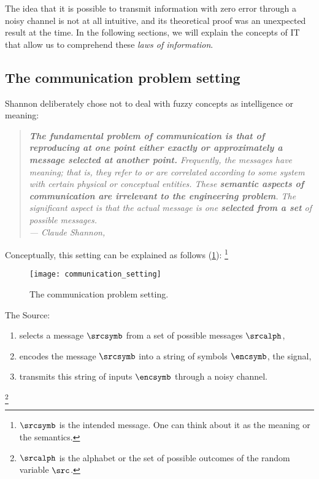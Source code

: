 The idea that it is possible to transmit information with zero error through a noisy channel is not at all intuitive, and its theoretical proof was an unexpected result at the time. In the following sections, we will explain the concepts of \ac{IT} that allow us to comprehend these \emph{laws of information}.

\subsection{The communication problem setting}\label{sec:communication_problem_setting}

Shannon deliberately chose not to deal with fuzzy concepts as intelligence or meaning:
\begin{quotation}
	\small \emph{ \textbf{The fundamental problem of communication is that of reproducing at one point either exactly or approximately a message selected at another point.} Frequently, the messages have meaning; that is, they refer to or are correlated according to some system with certain physical or conceptual entities. These \textbf{semantic aspects of communication are irrelevant to the engineering problem}. The significant aspect is that the actual message is one \textbf{selected from a set} of possible messages.\\
	\flushright --- Claude Shannon,~\\}
	\vspace{1cm}
\end{quotation}

Conceptually, this setting can be explained as follows (\cref{fig:communication_setting}): \footnote{\(\srcsymb\) is the intended message. One can think about it as the meaning or the semantics.}

\begin{figure}[hbt!]
	\centering
	\texttt{[image: communication\_setting]}
	\caption{The communication problem setting.}\label{fig:communication_setting}
\end{figure}


The Source:
\begin{enumerate}
	\item selects a message  $\srcsymb$ from a set of possible messages $\srcalph$,
	\item encodes the message $\srcsymb$ into a string of symbols $\encsymb$, the signal,
	\item transmits this string of inputs $\encsymb$ through a noisy channel.
\end{enumerate}
\footnote{\(\srcalph\) is the alphabet or the set of possible outcomes of the random variable \(\src\).}

